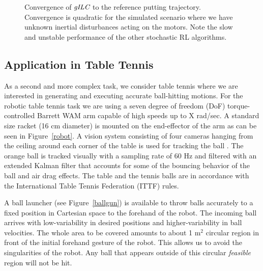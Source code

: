 
\begin{figure}
\center
\newlength\figureheight 
\newlength\figurewidth 
\setlength\figureheight{6cm}  
\setlength\figurewidth{6cm} 
\scalebox{1.0}{}
\caption{Convergence of $\emph{gILC}$ to the reference putting trajectory. Convergence is quadratic for the simulated scenario where we have unknown inertial disturbances acting on the motors. Note the slow and unstable performance of the other stochastic RL algorithms.}
\label{wILCTrajectoryPutting}
\end{figure}

\subsection{Application in Table Tennis}


As a second and more complex task, we consider table tennis where we are interested in generating and executing accurate ball-hitting motions. For the robotic table tennis task we are using a seven degree of freedom (DoF) torque-controlled Barrett WAM arm capable of high speeds up to X rad/sec. A standard size racket (16 cm diameter) is mounted on the end-effector of the arm as can be seen in Figure~\ref{robot}. A vision system consisting of four cameras hanging from the ceiling around each corner of the table is used for tracking the ball \cite{Lampert12}. The orange ball is tracked  visually with a sampling rate of 60 Hz and filtered with an extended Kalman filter that accounts for some of the bouncing behavior of the ball and air drag effects. The table and the tennis balls are in accordance with the International Table Tennis Federation (ITTF) rules.

A ball launcher (see Figure~\ref{ballgun}) is available to throw balls accurately to a fixed position in Cartesian space to the forehand of the robot. The incoming ball arrives with low-variability in desired positions and higher-variability in ball velocities. The whole area to be covered amounts to about 1 m$^2$ circular region in front of the initial forehand gesture of the robot. This allows us to avoid the singularities of the robot. Any ball that appears outside of this circular \emph{feasible} region will not be hit.

